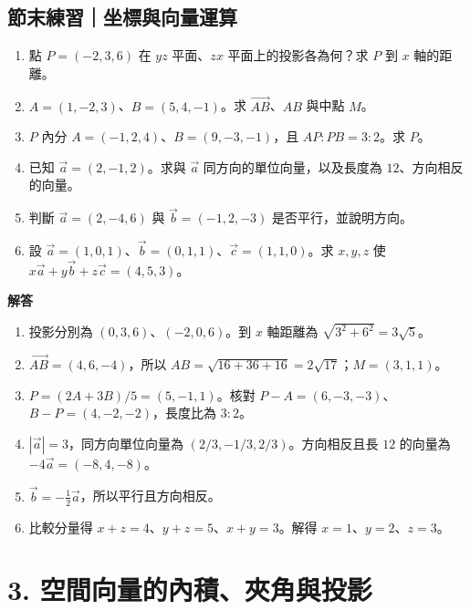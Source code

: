 \documentclass[11pt,a4paper]{article}
\providecommand{\tightlist}{%
  \setlength{\itemsep}{0pt}\setlength{\parskip}{0pt}}
\begin{document}
\begin{HandoutSelfCheck}

\subsection{節末練習｜坐標與向量運算}\label{ux7bc0ux672bux7df4ux7fd2ux5750ux6a19ux8207ux5411ux91cfux904bux7b97}

\begin{enumerate}
\def\labelenumi{\arabic{enumi}.}
\tightlist
\item
  點 \(P=(-2,3,6)\) 在 \(yz\) 平面、\(zx\) 平面上的投影各為何？求 \(P\) 到 \(x\) 軸的距離。
\item
  \(A=(1,-2,3)\)、\(B=(5,4,-1)\)。求 \(\overrightarrow{AB}\)、\(AB\) 與中點 \(M\)。
\item
  \(P\) 內分 \(A=(-1,2,4)\)、\(B=(9,-3,-1)\)，且 \(AP:PB=3:2\)。求 \(P\)。
\item
  已知 \(\vec a=(2,-1,2)\)。求與 \(\vec a\) 同方向的單位向量，以及長度為 \(12\)、方向相反的向量。
\item
  判斷 \(\vec a=(2,-4,6)\) 與 \(\vec b=(-1,2,-3)\) 是否平行，並說明方向。
\item
  設 \(\vec a=(1,0,1)\)、\(\vec b=(0,1,1)\)、\(\vec c=(1,1,0)\)。求 \(x,y,z\) 使 \(x\vec a+y\vec b+z\vec c=(4,5,3)\)。
\end{enumerate}

\textbf{解答}

\begin{enumerate}
\def\labelenumi{\arabic{enumi}.}
\tightlist
\item
  投影分別為 \((0,3,6)\)、\((-2,0,6)\)。到 \(x\) 軸距離為 \(\sqrt{3^2+6^2}=3\sqrt5\)。
\item
  \(\overrightarrow{AB}=(4,6,-4)\)，所以 \(AB=\sqrt{16+36+16}=2\sqrt{17}\)；\(M=(3,1,1)\)。
\item
  \(P=(2A+3B)/5=(5,-1,1)\)。核對 \(P-A=(6,-3,-3)\)、\(B-P=(4,-2,-2)\)，長度比為 \(3:2\)。
\item
  \(|\vec a|=3\)，同方向單位向量為 \((2/3,-1/3,2/3)\)。方向相反且長 \(12\) 的向量為 \(-4\vec a=(-8,4,-8)\)。
\item
  \(\vec b=-\tfrac12\vec a\)，所以平行且方向相反。
\item
  比較分量得 \(x+z=4\)、\(y+z=5\)、\(x+y=3\)。解得 \(x=1\)、\(y=2\)、\(z=3\)。
\end{enumerate}

\end{HandoutSelfCheck}

\section{3. 空間向量的內積、夾角與投影}\label{ux7a7aux9593ux5411ux91cfux7684ux5167ux7a4dux593eux89d2ux8207ux6295ux5f71}
\end{document}
